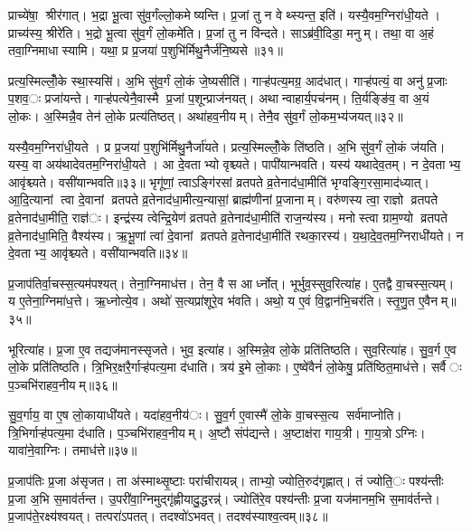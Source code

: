 प्राच्ये॑षा॒ श्रीर॑गात्। भ॒द्रा भू॒त्वा सु॑व॒र्गंल्लो॒कमेष्यन्ति। प्र॒जां तु न वेथ्स्यन्त॒ इति॑। यस्यै॒वम॒ग्निरा॑धी॒यते। प्राच्य॑स्य॒ श्रीरे॑ति। भ॒द्रो भू॒त्वा सु॑व॒र्गं लो॒कमे॑ति। प्र॒जां तु न वि॑न्दते। साऽब्र॑वी॒दिडा॒ मनुम्। तथा॒ वा अ॒हं तवा॒ग्निमाधास्यामि। यथा॒ प्र प्र॒जया॑ प॒शुभि॑र्मिथु॒नैर्ज॑नि॒ष्यसे॥३१॥

प्रत्य॒स्मिल्लोँ॒के स्था॒स्यसि॑। अ॒भि सु॑व॒र्गं लो॒कं जे॒ष्यसीति॑। गाऱ्ह॑पत्य॒मग्र॒ आद॑धात्। गाऱ्ह॑पत्यं॒ वा अनु॑ प्र॒जाः प॒शव॒ः प्रजा॑यन्ते। गाऱ्ह॑पत्येनै॒वास्मै प्र॒जां प॒शून्प्राज॑नयत्। अथान्वाहार्य॒पच॑नम्। ति॒र्यङ्ङि॑व॒ वा अ॒यं लो॒कः। अ॒स्मिन्नै॒व तेन॑ लो॒के प्रत्य॑तिष्ठत्। अथा॑हव॒नीयम्। तेनै॒व सु॑व॒र्गं लो॒कम॒भ्य॑जयत्॥३२॥

यस्यै॒वम॒ग्निरा॑धी॒यते। प्र प्र॒जया॑ प॒शुभि॑र्मिथु॒नैर्जा॑यते। प्रत्य॒स्मिल्लोँ॒के ति॑ष्ठति। अ॒भि सु॑व॒र्गं लो॒कं ज॑यति। यस्य॒ वा अय॑थादेवतम॒ग्निरा॑धी॒यते। आ दे॒वताभ्यो वृश्च्यते। पापी॑यान्भवति। यस्य॑ यथादेव॒तम्। न दे॒वताभ्य॒ आवृ॑श्च्यते। वसी॑यान्भवति॥३३॥ भृगू॑णां॒ त्वाऽङ्गि॑रसां व्रतपते व्र॒तेनाद॑धा॒मीति॑ भृग्वङ्गि॒रसा॒माद॑ध्यात्। आ॒दि॒त्यानां त्वा दे॒वानां व्रतपते व्र॒तेनाद॑धा॒मीत्य॒न्यासां॒ ब्राह्म॑णीनां प्र॒जानाम्। वरु॑णस्य त्वा॒ राज्ञो व्रतपते व्र॒तेनाद॑धा॒मीति॒ राज्ञ॑ः। इन्द्र॑स्य त्वेन्द्रि॒येण॑ व्रतपते व्र॒तेनाद॑धा॒मीति॑ राज॒न्य॑स्य। मनोस्त्वा ग्राम॒ण्यो व्रतपते व्र॒तेनाद॑धा॒मिति॒ वैश्य॑स्य। ऋ॒भू॒णां त्वा॑ दे॒वानां व्रतपते व्र॒तेनाद॑धा॒मीति॑ रथका॒रस्य॑। य॒था॒दे॒व॒तम॒ग्निराधी॑यते। न दे॒वताभ्य॒ आवृ॑श्च्यते। वसी॑यान्भवति॥३४॥

प्र॒जाप॑तिर्वा॒चस्स॒त्यम॑पश्यत्। तेना॒ग्निमाध॑त्त। तेन॒ वै स आर्ध्नोत्। भूर्भुव॒स्सुव॒रित्या॑ह। ए॒तद्वै वा॒चस्स॒त्यम्। य ए॒तेना॒ग्निमा॑ध॒त्ते। ऋ॒ध्नोत्ये॒व। अथो॑ स॒त्यप्रा॑शूरे॒व भ॑वति। अथो॒ य ए॒वं वि॒द्वान॑भि॒चर॑ति। स्तृ॒णु॒त ए॒वैनम्॥३५॥

भूरित्या॑ह। प्र॒जा ए॒व तद्यज॑मानस्सृजते। भुव॒ इत्या॑ह। अ॒स्मिन्ने॒व लो॒के प्रति॑तिष्ठति। सुव॒रित्या॑ह। सु॒व॒र्ग ए॒व लो॒के प्रति॑तिष्ठति। त्रि॒भिर॒क्षरै॒र्गाऱ्ह॑पत्य॒मा द॑धाति। त्रय॑ इ॒मे लो॒काः। ए॒ष्वे॑वैनं॑ लो॒केषु॒ प्रति॑ष्ठित॒माध॑त्ते। सर्वैः प॒ञ्चभि॑राहव॒नीयम्॥३६॥

सु॒व॒र्गाय॒ वा ए॒ष लो॒कायाधी॑यते। यदा॑हव॒नीय॑ः। सु॒व॒र्ग ए॒वास्मै॑ लो॒के वा॒चस्स॒त्य सर्व॑माप्नोति। त्रि॒भिर्गाऱ्ह॑पत्य॒मा द॑धाति। प॒ञ्चभि॑राहव॒नीयम्। अ॒ष्टौ संप॑द्यन्ते। अ॒ष्टाक्ष॑रा गाय॒त्री। गा॒य॒त्रोऽग्निः। यावा॑ने॒वाग्निः। तमाध॑त्ते॥३७॥

प्र॒जाप॑तिः प्र॒जा अ॑सृजत। ता अ॑स्माथ्सृ॒ष्टाः परा॑चीरायन्न्। ताभ्यो॒ ज्योति॒रुद॑गृह्णात्। तं ज्योति॒ः पश्य॑न्तीः प्र॒जा अ॒भि स॒माव॑र्तन्त। उ॒परी॑वा॒ग्निमुद्गृ॑ह्णीयादु॒द्धरन्न्॑। ज्योति॑रे॒व पश्य॑न्तीः प्र॒जा यज॑मानम॒भि स॒माव॑र्तन्ते। प्र॒जाप॑ते॒रक्ष्य॑श्वयत्। तत्परा॑ऽपतत्। तदश्वो॑ऽभवत्। तदश्व॑स्याश्व॒त्वम्॥३८॥

